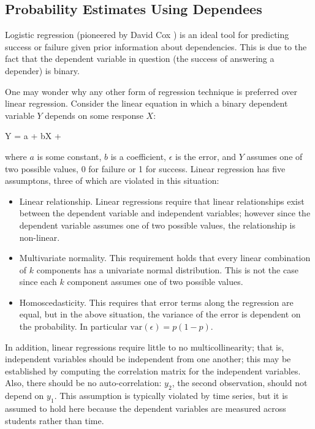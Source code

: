 \subsection{Probability Estimates Using Dependees}

Logistic regression (pioneered by David Cox \cite{cox:1958}) is an ideal tool
for predicting success or failure given prior information about dependencies.
This is due to the fact that the dependent variable in question (the success of
answering a depender) is binary.  

One may wonder why any other form of regression technique is preferred over
linear regression.  Consider the linear equation in which a binary dependent
variable $Y$ depends on some response $X$:

\begin{equations}
         Y = a + bX + \epsilon
\end{equations}

where $a$ is some constant, $b$ is a coefficient, $\epsilon$ is the error, and
$Y$ assumes one of two possible values, 0 for failure or 1 for success.  Linear
regression has five assumptons, three of which are violated in this situation:

\begin{itemize}

  \item Linear relationship. Linear regressions require that linear
  relationships exist between the dependent variable and independent variables;
  however since the dependent variable assumes one of two possible values, the
  relationship is non-linear.

  \item Multivariate normality. This requirement holds that every linear
  combination of $k$ components has a univariate normal distribution.  This
  is not the case since each $k$ component assumes one of two possible values.

  \item Homoscedasticity. This requires that error terms along the regression
  are equal, but in the above situation, the variance of the error is dependent
  on the probability.   In particular $\mathrm{var}(\epsilon) = p(1-p)$.

\end{itemize} 

In addition, linear regressions require little to no multicollinearity; that
is, independent variables should be independent from one another; this may be
established by computing the correlation matrix for the independent variables.
Also, there should be no auto-correlation: $y_2$, the second observation,
should not depend on $y_1$.  This assumption is typically violated by time
series, but it is assumed to hold here because the dependent variables are
measured across students rather than time.  

